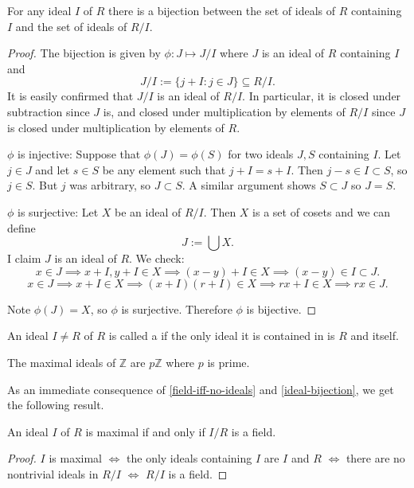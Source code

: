 \begin{lemma}\label{ideal-bijection}
For any ideal $I$ of $R$ there is a bijection between the set of ideals of $R$ containing $I$ and the set of ideals of $R/I$.
\end{lemma}
\begin{proof}
The bijection is given by $\phi:J\mapsto J/I$ where $J$ is an ideal of $R$ containing $I$ and $$J/I:=\{j+I:j\in J\}\subseteq R/I.$$ It is easily confirmed that $J/I$ is an ideal of $R/I$. In particular, it is closed under subtraction since $J$ is, and closed under multiplication by elements of $R/I$ since $J$ is closed under multiplication by elements of $R$.

$\phi$ is injective: Suppose that $\phi(J)=\phi(S)$ for two ideals $J,S$ containing $I$. Let $j\in J$ and let $s\in S$ be any element such that $j+I=s+I$. Then $j-s\in I\subset S$, so $j\in S$. But $j$ was arbitrary, so $J\subset S$. A similar argument shows $S\subset J$ so $J=S$.

$\phi$ is surjective: Let $X$ be an ideal of $R/I$. Then $X$ is a set of cosets and we can define $$J:=\bigcup X.$$ I claim $J$ is an ideal of $R$. We check:
$$x\in J\implies x+I,y+I\in X\implies (x-y)+I\in X\implies (x-y)\in I\subset J.$$
$$x\in J\implies x+I\in X\implies (x+I)(r+I)\in X\implies rx+I\in X\implies rx\in J.$$

Note $\phi(J)=X$, so $\phi$ is surjective. Therefore $\phi$ is bijective.\end{proof}

\begin{definition}
An ideal $I\neq R$ of $R$ is called a  if the only ideal it is contained in is $R$ and itself.
\end{definition}

\begin{example}
The maximal ideals of $\mathbb{Z}$ are $p\mathbb{Z}$ where $p$ is prime.
\end{example}
As an immediate consequence of \cref{field-iff-no-ideals} and \cref{ideal-bijection}, we get the following result.
\begin{lemma}\label{ring-over-max-field}
An ideal $I$ of $R$ is maximal if and only if $I/R$ is a field.
\end{lemma}
\begin{proof}
$I$ is maximal $\iff$ the only ideals containing $I$ are $I$ and $R$ $\iff$ there are no nontrivial ideals in $R/I$ $\iff$ $R/I$ is a field.


\end{proof}

